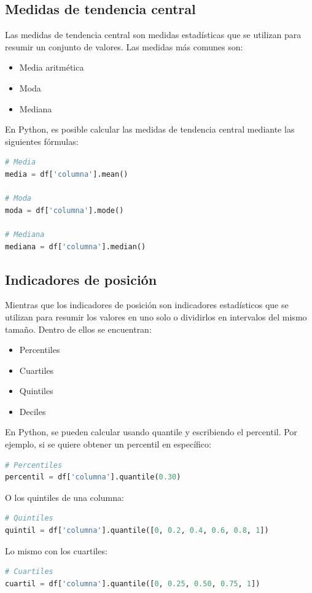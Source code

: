 \documentclass[a4paper, 12pt]{book}
\begin{document}
\subsection{Medidas de tendencia central}
Las medidas de tendencia central son medidas estadísticas que se utilizan para resumir un conjunto de valores. Las medidas más comunes son:

\begin{itemize}
	\item Media aritmética
	\item Moda
	\item Mediana
\end{itemize}

En Python, es posible calcular las medidas de tendencia central mediante las siguientes fórmulas:
\begin{lstlisting}[language=Python]
# Media
media = df['columna'].mean()

# Moda
moda = df['columna'].mode()

# Mediana
mediana = df['columna'].median()
\end{lstlisting}

\subsection{Indicadores de posición}
Mientras que los indicadores de posición son indicadores estadísticos que se utilizan para resumir los valores en uno solo o dividirlos en intervalos del mismo tamaño. Dentro de ellos se encuentran:
\begin{itemize}
	\item Percentiles
	\item Cuartiles
	\item Quintiles
	\item Deciles
\end{itemize}
En Python, se pueden calcular usando quantile y escribiendo el percentil. Por ejemplo, si se quiere obtener un percentil en específico:
\begin{lstlisting}[language=Python]
# Percentiles
percentil = df['columna'].quantile(0.30)
\end{lstlisting}
O los quintiles de una columna:
\begin{lstlisting}[language=Python]
# Quintiles
quintil = df['columna'].quantile([0, 0.2, 0.4, 0.6, 0.8, 1])
\end{lstlisting}
Lo mismo con los cuartiles:
\begin{lstlisting}[language=Python]
# Cuartiles
cuartil = df['columna'].quantile([0, 0.25, 0.50, 0.75, 1])
\end{lstlisting}
\end{document}
